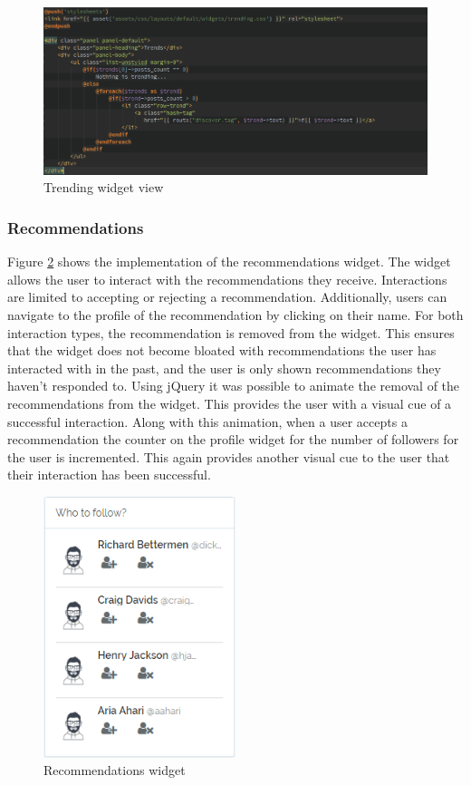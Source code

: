 \begin{figure}[H]
    \centering
    \includegraphics[width=\textwidth]{Images/Implementation/UI/Widgets/trending-blade}
    \caption{Trending widget view}
    \label{fig:trending-blade}
\end{figure}

\subsubsection{Recommendations}
Figure \ref{fig:RecommendationsWidget} shows the implementation of the recommendations widget. The widget allows the user to interact with the recommendations they receive. Interactions are limited to accepting or rejecting a recommendation. Additionally, users can navigate to the profile of the recommendation by clicking on their name. For both interaction types, the recommendation is removed from the widget. This ensures that the widget does not become bloated with recommendations the user has interacted with in the past, and the user is only shown recommendations they haven't responded to. Using jQuery it was possible to animate the removal of the recommendations from the widget. This provides the user with a visual cue of a successful interaction. Along with this animation, when a user accepts a recommendation the counter on the profile widget for the number of followers for the user is incremented. This again provides another visual cue to the user that their interaction has been successful.

\begin{figure}[H]
\centering
\includegraphics[height=3in]{Images/Implementation/RecommendationsWidget}
\caption{Recommendations widget}
\label{fig:RecommendationsWidget}
\end{figure}

